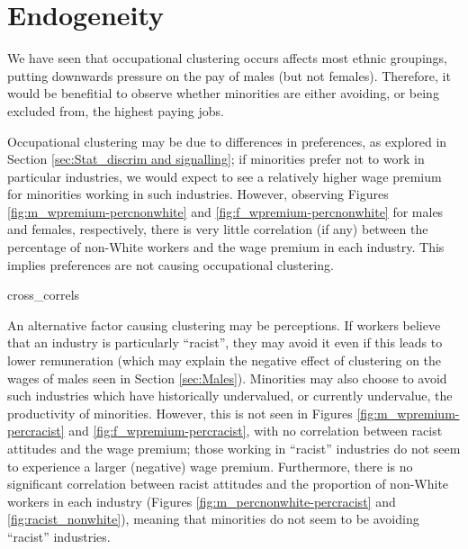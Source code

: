 \documentclass[class=article, crop=false]{standalone}
\begin{document}
\section{Endogeneity}
\label{sec:endogeneity}
We have seen that occupational clustering occurs affects most ethnic groupings, putting downwards pressure on the pay of males (but not females). Therefore, it would be benefitial to observe whether minorities are either avoiding, or being excluded from, the highest paying jobs.

Occupational clustering may be due to differences in preferences, as explored in Section \ref{sec:Stat_discrim and signalling}; if minorities prefer not to work in particular industries, we would expect to see a relatively higher wage premium for minorities working in such industries. However, observing Figures \ref{fig:m_wpremium-percnonwhite} and \ref{fig:f_wpremium-percnonwhite} for males and females, respectively, there is very little correlation (if any) between the percentage of non-White workers and the wage premium in each industry. This implies preferences are not causing occupational clustering.

{cross_correls}
%

An alternative factor causing clustering may be perceptions. If workers believe that an industry is particularly \enquote{racist}, they may avoid it even if this leads to lower remuneration (which may explain the negative effect of clustering on the wages of males seen in Section \ref{sec:Males}). Minorities may also choose to avoid such industries which have historically undervalued, or currently undervalue, the productivity of minorities. However, this is not seen in Figures \ref{fig:m_wpremium-percracist} and \ref{fig:f_wpremium-percracist}, with no correlation between racist attitudes and the wage premium; those working in \enquote{racist} industries do not seem to experience a larger (negative) wage premium. Furthermore, there is no significant correlation between racist attitudes and the proportion of non-White workers in each industry (Figures \ref{fig:m_percnonwhite-percracist} and \ref{fig:racist_nonwhite}), meaning that minorities do not seem to be avoiding \enquote{racist} industries.
\end{document}
